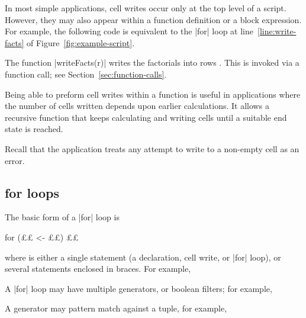 In most simple applications, cell writes occur only at the top level of a
script.  However, they may also appear within a function definition or a
block expression.  For example, the following code is equivalent to the |for|
loop at line~\ref{line:write-facts} of Figure~\ref{fig:example-script}.
%
%
The function |writeFacts(r)| writes the factorials into rows .  This is invoked via a function call; see
Section~\ref{sec:function-calls}. 

Being able to preform cell writes within a function is useful in applications
where the number of cells written depends upon earlier calculations.  It
allows a recursive function that keeps calculating and writing cells until a
suitable end state is reached.

Recall that the application treats any attempt to write to a non-empty cell as
an error. 


\subsection{{\scalashape for} loops}
\label{ssec:for-loops}

The basic form of a |for| loop is
\begin{scala}
for (££ <- ££) ££
\end{scala}
where  is either a single statement (a declaration, cell
write, or |for| loop), or several statements enclosed in braces.  For example,
%

A |for| loop may have multiple generators, or boolean filters; for example,
%

A generator may pattern match against a tuple, for example,

